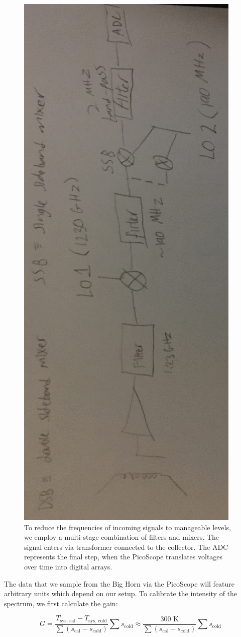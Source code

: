 \documentclass[12pt]{article}
\begin{document}
\begin{figure}
\centering
	\includegraphics[angle=-90, width=.6\linewidth]{block}
	\caption{To reduce the frequencies of incoming signals to manageable levels, we employ a multi-stage combination of filters and mixers. The signal enters via transformer connected to the collector. The ADC represents the final step, when the PicoScope translates voltages over time into digital arrays.}
	\label{fig:block}
\end{figure}

The data that we sample from the Big Horn via the PicoScope will feature arbitrary units which depend on our setup. To calibrate the intensity of the spectrum, we first calculate the gain:

\begin{equation} \label{eq:thermal}
G = \frac{T_\text{sys, cal} - T_\text{sys, cold}}{\sum (s_\text{cal} - s_\text{cold})} \sum s_\text{cold} \approx \frac{\text{300 K}}{\sum (s_\text{cal} - s_\text{cold})} \sum s_\text{cold}
\end{equation}
\end{document}
